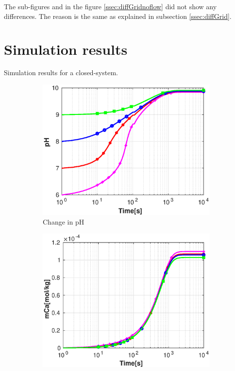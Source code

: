 The sub-figures  and  in the figure \ref{ssec:diffGridnoflow} did not show any differences. The reason is the same as explained in subsection \ref{ssec:diffGrid}.

\section{\MATLAB Simulation results}
\MATLAB Simulation results for a closed-system. 

\begin{figure}[!h]
        \centering
    \begin{subfigure}{.5\linewidth}
        \centering
        \includegraphics[width=\textwidth]{PICTURES/without_vel_pH.eps}
        \caption{Change in pH}
        \label{fig:withoutvelpH}       %
    \end{subfigure}%
        \hfill
    \begin{subfigure}{.5\linewidth}
        \centering
        \includegraphics[width=\textwidth]{PICTURES/without_vel_mCa.eps}

\end{subfigure}
\end{figure}

